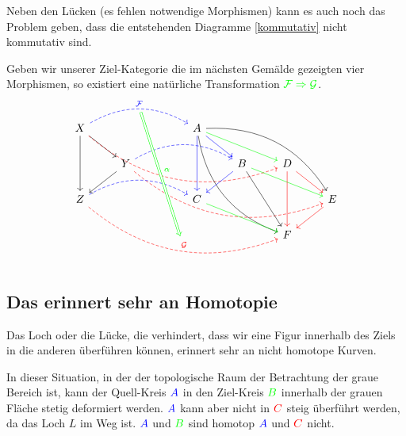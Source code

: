 \documentclass[a4paper]{amsart}
\theoremstyle{definition}
\begin{document}
Neben den Lücken (es fehlen notwendige Morphismen) kann es auch noch das Problem geben, dass die entstehenden Diagramme \eqref{kommutativ} nicht kommutativ sind.

Geben wir unserer Ziel-Kategorie die im nächsten Gemälde gezeigten vier Morphismen, so existiert eine natürliche Transformation 
$\color{green} \mathcal F \Rightarrow \mathcal G$. 
\begin{equation}
	\begin{tikzcd}
		X \arrow[dd] \arrow[dr] \arrow[rrr, blue, dashed, bend left, "\mathcal F"{name=0}] \arrow[rrrrrd, red, dashed, bend right] &&& A \arrow[dd, blue] \arrow[dr, blue] \arrow[dddrr, bend right] \arrow[drr, green] \arrow[ddrrr, bend left]\\ 
		& Y \arrow[dl] \arrow[rrr, blue, dashed, bend left] \arrow[rrrrrd, red, dashed, bend right] &&&B \arrow[dl, blue] \arrow[ddr] \arrow[drr, green] &D \arrow[dd, red] \arrow[dr, red]\\
		Z \arrow[rrr, blue, dashed, bend left] \arrow[rrrrrd, red, dashed, bend right, "\mathcal G"{name=1}] &&&C  \arrow[drr, green] &&& E \arrow[dl, red]\\
		&&&&&F
		\arrow[Rightarrow, green, from=0, to=1,shorten >= 6pt, yshift = -3pt, "\alpha"{yshift=3pt}]
	\end{tikzcd}
\end{equation}

\subsection{Das erinnert sehr an Homotopie}
Das Loch oder die Lücke, die verhindert, dass wir eine Figur innerhalb des Ziels in die anderen überführen können, erinnert sehr an nicht homotope Kurven.


In dieser Situation, in der der topologische Raum der Betrachtung der graue Bereich ist, kann der Quell-Kreis $\color{blue}A$ in den Ziel-Kreis $\color{green}B$ innerhalb der grauen Fläche stetig deformiert werden. $\color{blue}A$ kann aber nicht in $\color{red}C$ steig überführt werden, da das Loch $L$ im Weg ist. $\color{blue}A$ und $\color{green}B$ sind homotop $\color{blue}A$ und $\color{red}C$ nicht.
\end{document}

